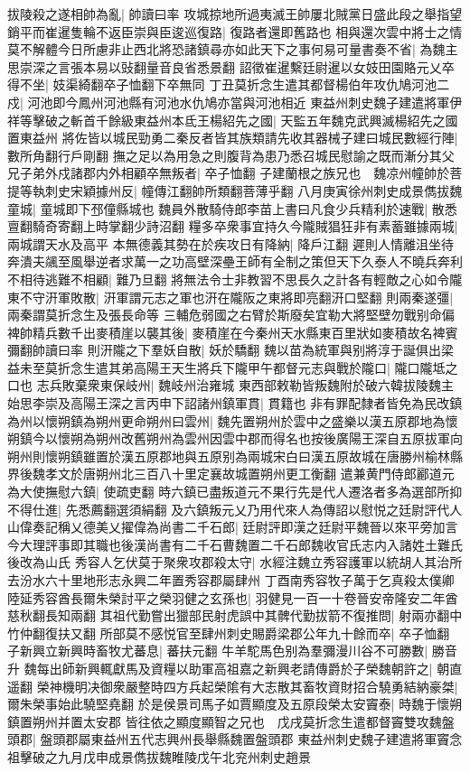 拔陵殺之遂相帥為亂|{
	帥讀曰率}
攻城掠地所過夷滅王帥屢北賊黨日盛此段之舉指望銷平而崔暹隻輪不返臣崇與臣逡巡復路|{
	復路者還即舊路也}
相與還次雲中將士之情莫不解體今日所慮非止西北將恐諸鎮尋亦如此天下之事何易可量書奏不省|{
	為魏主思崇深之言張本易以䜴翻量音良省悉景翻}
詔徵崔暹繫廷尉暹以女妓田園賂元乂卒得不坐|{
	妓渠綺翻卒子恤翻下卒無同}
丁丑莫折念生遣其都督楊伯年攻仇鳩河池二戍|{
	河池即今鳳州河池縣有河池水仇鳩亦當與河池相近}
東益州刺史魏子建遣將軍伊祥等擊破之斬首千餘級東益州本氐王楊紹先之國|{
	天監五年魏克武興滅楊紹先之國置東益州}
將佐皆以城民勁勇二秦反者皆其族類請先收其器械子建曰城民數經行陣|{
	數所角翻行戶剛翻}
撫之足以為用急之則腹背為患乃悉召城民慰諭之既而漸分其父兄子弟外戍諸郡内外相顧卒無叛者|{
	卒子恤翻}
子建蘭根之族兄也　魏凉州幢帥於菩提等執刺史宋穎據州反|{
	幢傳江翻帥所類翻菩薄乎翻}
八月庚寅徐州刺史成景儁拔魏童城|{
	童城即下邳僮縣城也}
魏員外散騎侍郎李苗上書曰凡食少兵精利於速戰|{
	散悉亶翻騎奇寄翻上時掌翻少詩沼翻}
糧多卒衆事宜持久今隴賊猖狂非有素蓄雖據兩城|{
	兩城謂天水及高平}
本無德義其勢在於疾攻日有降納|{
	降戶江翻}
遲則人情離沮坐待奔潰夫飊至風舉逆者求萬一之功高壁深壘王師有全制之策但天下久泰人不曉兵奔利不相待逃難不相顧|{
	難乃旦翻}
將無法令士非教習不思長久之計各有輕敵之心如令隴東不守汧軍敗散|{
	汧軍謂元志之軍也汧在隴阪之東將即亮翻汧口堅翻}
則兩秦遂彊|{
	兩秦謂莫折念生及張長命等}
三輔危弱國之右臂於斯廢矣宜勒大將堅壁勿戰别命偏裨帥精兵數千出麥積崖以襲其後|{
	麥積崖在今秦州天水縣東百里狀如麥積故名裨賓彌翻帥讀曰率}
則汧隴之下羣妖自散|{
	妖於驕翻}
魏以苗為統軍與别將淳于誕俱出梁益未至莫折念生遣其弟高陽王天生將兵下隴甲午都督元志與戰於隴口|{
	隴口隴坻之口也}
志兵敗棄衆東保岐州|{
	魏岐州治雍城}
東西部敕勒皆叛魏附於破六韓拔陵魏主始思李崇及高陽王深之言丙申下詔諸州鎮軍貫|{
	貫籍也}
非有罪配隸者皆免為民改鎮為州以懷朔鎮為朔州更命朔州曰雲州|{
	魏先置朔州於雲中之盛樂以漢五原郡地為懷朔鎮今以懷朔為朔州改舊朔州為雲州因雲中郡而得名也按後廣陽王深自五原拔軍向朔州則懷朔鎮雖置於漢五原郡地與五原别為兩城宋白曰漢五原故城在唐勝州榆林縣界後魏孝文於唐朔州北三百八十里定襄故城置朔州更工衡翻}
遣兼黄門侍郎酈道元為大使撫慰六鎮|{
	使疏吏翻}
時六鎮已盡叛道元不果行先是代人遷洛者多為選部所抑不得仕進|{
	先悉薦翻選須絹翻}
及六鎮叛元乂乃用代來人為傳詔以慰悦之廷尉評代人山偉奏記稱乂德美乂擢偉為尚書二千石郎|{
	廷尉評即漢之廷尉平魏晉以來平旁加言今大理評事即其職也後漢尚書有二千石曹魏置二千石郎魏收官氏志内入諸姓土難氏後改為山氏}
秀容人乞伏莫于聚衆攻郡殺太守|{
	水經注魏立秀容護軍以統胡人其治所去汾水六十里地形志永興二年置秀容郡屬肆州}
丁酉南秀容牧子萬于乞真殺太僕卿陸延秀容酋長爾朱榮討平之榮羽健之玄孫也|{
	羽健見一百一十卷晉安帝隆安二年酋慈秋翻長知兩翻}
其祖代勤嘗出獵部民射虎誤中其髀代勤拔箭不復推問|{
	射兩亦翻中竹仲翻復扶又翻}
所部莫不感悦官至肆州刺史賜爵梁郡公年九十餘而卒|{
	卒子恤翻}
子新興立新興時畜牧尤蕃息|{
	蕃扶元翻}
牛羊駝馬色别為羣彌漫川谷不可勝數|{
	勝音升}
魏每出師新興輒獻馬及資糧以助軍高祖嘉之新興老請傳爵於子榮魏朝許之|{
	朝直遥翻}
榮神機明决御衆嚴整時四方兵起榮隂有大志散其畜牧資財招合驍勇結納豪桀|{
	爾朱榮事始此驍堅堯翻}
於是侯景司馬子如賈顯度及五原段榮太安竇泰|{
	時魏于懷朔鎮置朔州并置太安郡}
皆往依之顯度顯智之兄也　戊戌莫折念生遣都督竇雙攻魏盤頭郡|{
	盤頭郡屬東益州五代志興州長舉縣魏置盤頭郡}
東益州刺史魏子建遣將軍竇念祖擊破之九月戊申成景儁拔魏睢陵戊午北兖州刺史趙景

